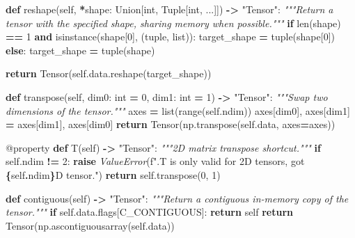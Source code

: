 \documentclass[
  letterpaper,
]{scrbook}
\newenvironment{Shaded}{\begin{snugshade}}{\end{snugshade}}
\newcommand{\AttributeTok}[1]{\textcolor[rgb]{0.13,0.29,0.53}{#1}}
\newcommand{\BuiltInTok}[1]{#1}
\newcommand{\CommentTok}[1]{\textcolor[rgb]{0.56,0.35,0.01}{\textit{#1}}}
\newcommand{\ControlFlowTok}[1]{\textcolor[rgb]{0.13,0.29,0.53}{\textbf{#1}}}
\newcommand{\DecValTok}[1]{\textcolor[rgb]{0.00,0.00,0.81}{#1}}
\newcommand{\KeywordTok}[1]{\textcolor[rgb]{0.13,0.29,0.53}{\textbf{#1}}}
\newcommand{\NormalTok}[1]{#1}
\newcommand{\OperatorTok}[1]{\textcolor[rgb]{0.81,0.36,0.00}{\textbf{#1}}}
\newcommand{\PreprocessorTok}[1]{\textcolor[rgb]{0.56,0.35,0.01}{\textit{#1}}}
\newcommand{\SpecialCharTok}[1]{\textcolor[rgb]{0.81,0.36,0.00}{\textbf{#1}}}
\newcommand{\SpecialStringTok}[1]{\textcolor[rgb]{0.31,0.60,0.02}{#1}}
\newcommand{\StringTok}[1]{\textcolor[rgb]{0.31,0.60,0.02}{#1}}
\newcommand{\VariableTok}[1]{\textcolor[rgb]{0.00,0.00,0.00}{#1}}
\begin{document}
\begin{Shaded}
\begin{Highlighting}[]
\KeywordTok{def}\NormalTok{ reshape(}\VariableTok{self}\NormalTok{, }\OperatorTok{*}\NormalTok{shape: Union[}\BuiltInTok{int}\NormalTok{, Tuple[}\BuiltInTok{int}\NormalTok{, ...]]) }\OperatorTok{{-}\textgreater{}} \StringTok{"Tensor"}\NormalTok{:}
    \CommentTok{"""Return a tensor with the specified shape, sharing memory when possible."""}
    \ControlFlowTok{if} \BuiltInTok{len}\NormalTok{(shape) }\OperatorTok{==} \DecValTok{1} \KeywordTok{and} \BuiltInTok{isinstance}\NormalTok{(shape[}\DecValTok{0}\NormalTok{], (}\BuiltInTok{tuple}\NormalTok{, }\BuiltInTok{list}\NormalTok{)):}
\NormalTok{        target\_shape }\OperatorTok{=} \BuiltInTok{tuple}\NormalTok{(shape[}\DecValTok{0}\NormalTok{])}
    \ControlFlowTok{else}\NormalTok{:}
\NormalTok{        target\_shape }\OperatorTok{=} \BuiltInTok{tuple}\NormalTok{(shape)}

    \ControlFlowTok{return}\NormalTok{ Tensor(}\VariableTok{self}\NormalTok{.data.reshape(target\_shape))}

\KeywordTok{def}\NormalTok{ transpose(}\VariableTok{self}\NormalTok{, dim0: }\BuiltInTok{int} \OperatorTok{=} \DecValTok{0}\NormalTok{, dim1: }\BuiltInTok{int} \OperatorTok{=} \DecValTok{1}\NormalTok{) }\OperatorTok{{-}\textgreater{}} \StringTok{"Tensor"}\NormalTok{:}
    \CommentTok{"""Swap two dimensions of the tensor."""}
\NormalTok{    axes }\OperatorTok{=} \BuiltInTok{list}\NormalTok{(}\BuiltInTok{range}\NormalTok{(}\VariableTok{self}\NormalTok{.ndim))}
\NormalTok{    axes[dim0], axes[dim1] }\OperatorTok{=}\NormalTok{ axes[dim1], axes[dim0]}
    \ControlFlowTok{return}\NormalTok{ Tensor(np.transpose(}\VariableTok{self}\NormalTok{.data, axes}\OperatorTok{=}\NormalTok{axes))}

\AttributeTok{@property}
\KeywordTok{def}\NormalTok{ T(}\VariableTok{self}\NormalTok{) }\OperatorTok{{-}\textgreater{}} \StringTok{"Tensor"}\NormalTok{:}
    \CommentTok{"""2D matrix transpose shortcut."""}
    \ControlFlowTok{if} \VariableTok{self}\NormalTok{.ndim }\OperatorTok{!=} \DecValTok{2}\NormalTok{:}
        \ControlFlowTok{raise} \PreprocessorTok{ValueError}\NormalTok{(}\SpecialStringTok{f".T is only valid for 2D tensors, got }\SpecialCharTok{\{}\VariableTok{self}\SpecialCharTok{.}\NormalTok{ndim}\SpecialCharTok{\}}\SpecialStringTok{D tensor."}\NormalTok{)}
    \ControlFlowTok{return} \VariableTok{self}\NormalTok{.transpose(}\DecValTok{0}\NormalTok{, }\DecValTok{1}\NormalTok{)}

\KeywordTok{def}\NormalTok{ contiguous(}\VariableTok{self}\NormalTok{) }\OperatorTok{{-}\textgreater{}} \StringTok{"Tensor"}\NormalTok{:}
    \CommentTok{"""Return a contiguous in{-}memory copy of the tensor."""}
    \ControlFlowTok{if} \VariableTok{self}\NormalTok{.data.flags[}\StringTok{\textquotesingle{}C\_CONTIGUOUS\textquotesingle{}}\NormalTok{]:}
        \ControlFlowTok{return} \VariableTok{self}
    \ControlFlowTok{return}\NormalTok{ Tensor(np.ascontiguousarray(}\VariableTok{self}\NormalTok{.data))}
\end{Highlighting}
\end{Shaded}
\end{document}
